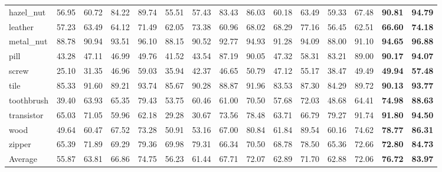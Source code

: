 \documentclass[letterpaper]{article} %
\begin{document}
\begin{table}[htbp]
{\begin{tabular}{l|cc|cc|cc|cc|cc|cc|cc}
hazel\_nut & 56.95 & 60.72 & 84.22 & 89.74 & 55.51 & 57.43 & 83.43 & 86.03 & 60.18 & 63.49 & 59.33 & 67.48 &\textbf{90.81} &\textbf{94.79} \\
leather & 57.23 & 63.49 & 64.12 & 71.49 & 62.05 & 73.38 & 60.96 & 68.02 & 68.29 & 77.16 & 56.45 & 62.51 &\textbf{66.60} &\textbf{74.18} \\
metal\_nut & 88.78 & 90.94 & 93.51 & 96.10 & 88.15 & 90.52 & 92.77 & 94.93 & 91.28 & 94.09 & 88.00 & 91.10 &\textbf{94.65} &\textbf{96.88} \\
pill & 43.28 & 47.11 & 46.99 & 49.76 & 41.52 & 43.54 & 87.19 & 90.05 & 47.32 & 58.31 & 83.21 & 89.00 &\textbf{90.17} &\textbf{94.07} \\
screw & 25.10 & 31.35 & 46.96 & 59.03 & 35.94 & 42.37 & 46.65 & 50.79 & 47.12 & 55.17 & 38.47 & 49.49 &\textbf{49.94} &\textbf{57.48} \\
tile & 85.33 & 91.60 & 89.21 & 93.74 & 85.67 & 90.28 & 88.87 & 91.96 & 83.53 & 87.30 & 84.29 & 89.72 &\textbf{90.13} &\textbf{93.77} \\
toothbrush & 39.40 & 63.93 & 65.35 & 79.43 & 53.75 & 60.46 & 61.00 & 70.50 & 57.68 & 72.03 & 48.68 & 64.41 &\textbf{74.98} &\textbf{88.63} \\
transistor & 65.03 & 71.05 & 59.96 & 62.18 & 29.28 & 30.67 & 73.56 & 78.48 & 63.71 & 66.79 & 79.27 & 91.74 &\textbf{91.80} &\textbf{94.50} \\
wood & 49.64 & 60.47 & 67.52 & 73.28 & 50.91 & 53.16 & 67.00 & 80.84 & 61.84 & 89.54 & 60.16 & 74.62 &\textbf{78.77} &\textbf{86.31} \\
zipper & 65.39 & 71.89 & 69.29 & 79.36 & 69.98 & 79.31 & 66.34 & 70.50 & 68.78 & 78.50 & 65.36 & 72.66 &\textbf{72.80} &\textbf{84.73} \\ \hline
Average
& 55.87 & 63.81
& 66.86 & 74.75
& 56.23 & 61.44
& 67.71 & 72.07
& 62.89 & 71.70
& 62.88 & 72.06
&\textbf{76.72} &\textbf{83.97} \\ \hline
\end{tabular}
}
\label{Segformer_mvtec}
\end{table}
\end{document}

